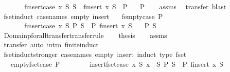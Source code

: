 \begin{isabellebody}
\ \ \ \ \ \ \ finsert{\isacharunderscore}case{\isacharcolon}\ {\isachardoublequoteopen}{\isasymAnd}x\ S{\isacharprime}{\isachardot}\ S\ {\isacharequal}\ finsert\ x\ S{\isacharprime}\ {\isasymLongrightarrow}\ P{\isachardoublequoteclose}\isanewline
\ \ \ {\isachardoublequoteopen}P{\isachardoublequoteclose}\isanewline
%
\isadelimproof
\ \ %
\endisadelimproof
%
\isatagproof
{}\isamarkupfalse%
\ assms\ \isamarkupfalse%
\ transfer\ blast%
\endisatagproof
{\isafoldproof}%
%
\isadelimproof
\isanewline
%
\endisadelimproof
\isanewline
{}\isamarkupfalse%
\ fset{\isacharunderscore}induct\ {\isacharbrackleft}case{\isacharunderscore}names\ empty\ insert{\isacharbrackright}{\isacharcolon}\isanewline
\ \ \ fempty{\isacharunderscore}case{\isacharcolon}\ {\isachardoublequoteopen}P\ {\isacharbraceleft}{\isacharbar}{\isacharbar}{\isacharbraceright}{\isachardoublequoteclose}\isanewline
\ \ \ \ \ \ \ finsert{\isacharunderscore}case{\isacharcolon}\ {\isachardoublequoteopen}{\isasymAnd}x\ S{\isachardot}\ P\ S\ {\isasymLongrightarrow}\ P\ {\isacharparenleft}finsert\ x\ S{\isacharparenright}{\isachardoublequoteclose}\isanewline
\ \ \ {\isachardoublequoteopen}P\ S{\isachardoublequoteclose}\isanewline
%
\isadelimproof
%
\endisadelimproof
%
\isatagproof
{}\isamarkupfalse%
\ {\isacharminus}\isanewline
\ \ \isanewline
\ \ \isamarkupfalse%
\ Domainp{\isacharunderscore}forall{\isacharunderscore}transfer{\isacharbrackleft}transfer{\isacharunderscore}rule{\isacharbrackright}\isanewline
\ \ \isamarkupfalse%
\ {\isacharquery}thesis\isanewline
\ \ \isamarkupfalse%
\ assms\ \isamarkupfalse%
\ transfer\ {\isacharparenleft}auto\ intro{\isacharcolon}\ finite{\isacharunderscore}induct{\isacharparenright}\isanewline
{}\isamarkupfalse%
%
\endisatagproof
{\isafoldproof}%
%
\isadelimproof
\isanewline
%
\endisadelimproof
\isanewline
{}\isamarkupfalse%
\ fset{\isacharunderscore}induct{\isacharunderscore}stronger\ {\isacharbrackleft}case{\isacharunderscore}names\ empty\ insert{\isacharcomma}\ induct\ type{\isacharcolon}\ fset{\isacharbrackright}{\isacharcolon}\isanewline
\ \ \ empty{\isacharunderscore}fset{\isacharunderscore}case{\isacharcolon}\ {\isachardoublequoteopen}P\ {\isacharbraceleft}{\isacharbar}{\isacharbar}{\isacharbraceright}{\isachardoublequoteclose}\isanewline
\ \ \ \ \ \ \ insert{\isacharunderscore}fset{\isacharunderscore}case{\isacharcolon}\ {\isachardoublequoteopen}{\isasymAnd}x\ S{\isachardot}\ {\isasymlbrakk}x\ {\isacharbar}{\isasymnotin}{\isacharbar}\ S{\isacharsemicolon}\ P\ S{\isasymrbrakk}\ {\isasymLongrightarrow}\ P\ {\isacharparenleft}finsert\ x\ S{\isacharparenright}{\isachardoublequoteclose}\isanewline

\end{isabellebody}
